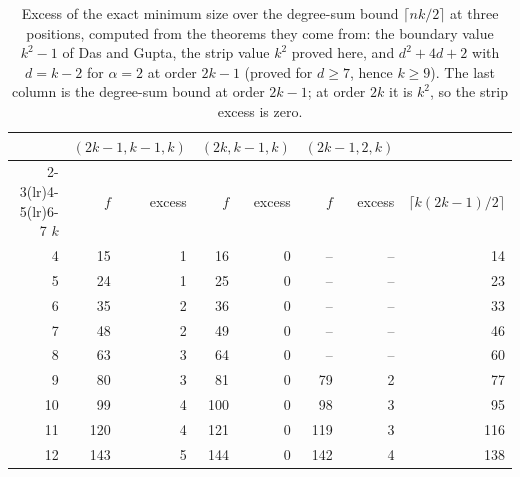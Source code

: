 \begin{table}[ht]
\centering\small
\setlength{\tabcolsep}{4pt}
\begin{tabular}{rrrrrrrr}
\toprule
 & \multicolumn{2}{c}{$(2k-1,k-1,k)$} & \multicolumn{2}{c}{$(2k,k-1,k)$} & \multicolumn{2}{c}{$(2k-1,2,k)$} & \\
\cmidrule(lr){2-3}\cmidrule(lr){4-5}\cmidrule(lr){6-7}
$k$ & $f$ & excess & $f$ & excess & $f$ & excess & $\lceil k(2k-1)/2\rceil$\\
\midrule
4 & 15 & 1 & 16 & 0 & -- & -- & 14\\
5 & 24 & 1 & 25 & 0 & -- & -- & 23\\
6 & 35 & 2 & 36 & 0 & -- & -- & 33\\
7 & 48 & 2 & 49 & 0 & -- & -- & 46\\
8 & 63 & 3 & 64 & 0 & -- & -- & 60\\
9 & 80 & 3 & 81 & 0 & 79 & 2 & 77\\
10 & 99 & 4 & 100 & 0 & 98 & 3 & 95\\
11 & 120 & 4 & 121 & 0 & 119 & 3 & 116\\
12 & 143 & 5 & 144 & 0 & 142 & 4 & 138\\
\bottomrule
\end{tabular}
\caption{Excess of the exact minimum size over the degree-sum bound $\lceil nk/2\rceil$ at three positions, computed from the theorems they come from: the boundary value $k^2-1$ of Das and Gupta, the strip value $k^2$ proved here, and $d^2+4d+2$ with $d=k-2$ for $\alpha=2$ at order $2k-1$ (proved for $d\ge7$, hence $k\ge9$). The last column is the degree-sum bound at order $2k-1$; at order $2k$ it is $k^2$, so the strip excess is zero.}
\label{tab:positions}
\end{table}
